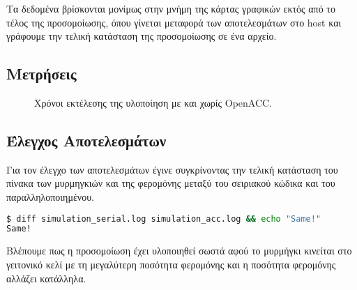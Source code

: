 \documentclass[11pt]{scrartcl} %
\begin{document}
Τα δεδομένα βρίσκονται μονίμως στην μνήμη της κάρτας γραφικών εκτός από το τέλος της προσομοίωσης, όπου γίνεται μεταφορά των αποτελεσμάτων στο host
και γράφουμε την τελική κατάσταση της προσομοίωσης σε ένα αρχείο.

\subsection{Μετρήσεις}


\begin{figure}[H]
    \begin{center}
    \end{center}
    \caption{Χρόνοι εκτέλεσης της υλοποίηση με και χωρίς OpenACC.}
    \label{fig:acc_times}
\end{figure}


\subsection{Έλεγχος Αποτελεσμάτων}

Για τον έλεγχο των αποτελεσμάτων έγινε συγκρίνοντας 
την τελική κατάσταση του πίνακα των μυρμηγκιών και της φερομόνης 
μεταξύ του σειριακού κώδικα και του παραλληλοποιημένου.

\begin{lstlisting}[language=Bash]
$ diff simulation_serial.log simulation_acc.log && echo "Same!"
Same!
\end{lstlisting}



Βλέπουμε πως η προσομοίωση έχει υλοποιηθεί σωστά αφού το μυρμήγκι κινείται στο γειτονικό κελί με τη μεγαλύτερη ποσότητα φερομόνης 
και η ποσότητα φερομόνης αλλάζει κατάλληλα.

% 
\end{document}
